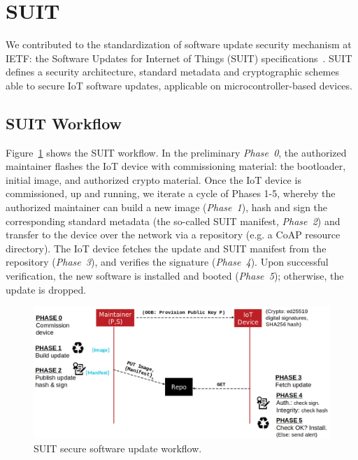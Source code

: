 \documentclass[../main.tex]{subfiles}
\begin{document}
	

	\section{SUIT}
	

We contributed to the standardization of software update security mechanism at IETF: the Software Updates for Internet of Things (SUIT) specifications~\cite{ietf2022suit}.
SUIT defines a security architecture, standard metadata and cryptographic schemes able to secure IoT software updates, applicable on microcontroller-based devices.

\subsection{SUIT Workflow}
\label{sec:suit-workflow}

Figure~\ref{fig:suit-workflow}
shows the SUIT workflow.
In the preliminary \emph{Phase~0},
the authorized maintainer %
flashes the IoT device with commissioning material: the bootloader, initial image, and authorized crypto material.
Once the IoT device is commissioned, up and running,
we iterate a cycle of Phases 1-5, whereby the authorized maintainer can
build a new image (\emph{Phase~1}), hash and sign the corresponding
standard metadata (the so-called SUIT manifest, \emph{Phase~2}) and
transfer to the device over the network via a repository (e.g. a CoAP
resource directory). The IoT device fetches the update and
SUIT manifest from the repository (\emph{Phase~3}),
and verifies the signature (\emph{Phase~4}).
Upon successful verification, the new software is installed and booted
(\emph{Phase~5}); otherwise, the update is dropped.


\begin{figure}[t!]
		\centering
		\includegraphics[width=\linewidth]{images/SUIT-workflow.png}
		\caption{SUIT secure software update workflow.}
		\label{fig:suit-workflow}
\end{figure}
\end{document}
